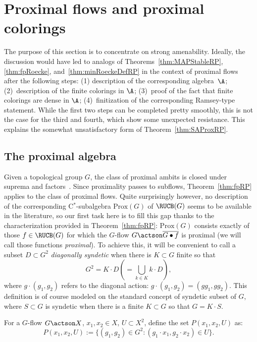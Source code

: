 \section{Proximal flows and proximal colorings}
\label{section:proximal}

The purpose of this section is to concentrate on strong amenability. Ideally, the discussion would have led to analogs of Theorems~\ref{thm:MAPStableRP}, \ref{thm:fpRoecke}, and~\ref{thm:minRoeckeDefRP} in the context of proximal flows after the following steps: (1) description of the corresponding algebra~$\A$; (2)~description of the finite colorings in $\A$; (3)~proof of the fact that finite colorings are dense in $\A$; (4)~finitization of the corresponding Ramsey-type statement. While the first two steps can be completed pretty smoothly, this is not the case for the third and fourth, which show some unexpected resistance. This explains the somewhat unsatisfactory form of Theorem~\ref{thm:SAProxRP}.

\subsection{The proximal algebra}

Given a topological group $G$, the class of proximal ambits is closed under suprema and factors~\cite[Chapter~IV, Section~5.30]{dV}. Since proximality passes to subflows, Theorem~\ref{thm:fpRP} applies to the class of proximal flows. Quite surprisingly however, no description of the corresponding C$^{*}$-subalgebra $\mathrm{Prox}(G)$ of $\RUCB(G)$ seems to be available in the literature, so our first task here is to fill this gap thanks to the characterization provided in Theorem~\ref{thm:fpRP}: $\mathrm{Prox}(G)$ consists exactly of those $f\in \RUCB(G)$ for which the $G$-flow $G\actson\overline{G\bullet f}$ is proximal (we will call those functions \emph{proximal}). To achieve this, it will be convenient to call a subset $D\subset G^{2}$ \emph{diagonally syndetic} when there is $K\subset G$ finite so that
\[
G^{2}=K\cdot D \left(=\bigcup_{k\in K}k\cdot D\right)\!,
\]
where $g\cdot(g_{1},g_{2})$ refers to the diagonal action: $g\cdot(g_{1},g_{2})=(gg_{1}, gg_{2})$. This definition is of course modeled on the standard concept of syndetic subset of $G$, where $S\subset G$ is syndetic when there is a finite $K\subset G$ so that $G=K\cdot S$.


For a $G$-flow $G\actson X$, $x_{1}, x_{2}\in X$, $U\subset X^{2}$, define the set $P(x_{1},x_{2},U)$ as:
\[
P(x_{1}, x_{2},U):=\{ (g_{1}, g_{2})\in G^{2}: (g_{1}\cdot x_{1}, g_{2}\cdot x_{2})\in U\}.
\]

